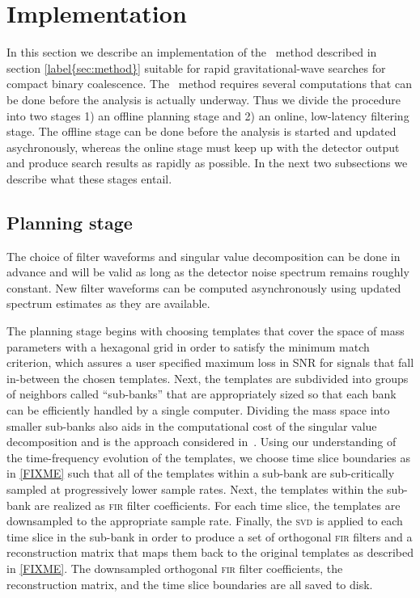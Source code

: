 \section{Implementation}
\label{sec:implementation}

In this section we describe an implementation of the \lloid\ method described
in section \ref{label{sec:method}} suitable for rapid gravitational-wave
searches for compact binary coalescence.  The \lloid\ method requires several
computations that can be done before the analysis is actually underway.  Thus
we divide the procedure into two stages 1) an offline planning stage and 2) an
online, low-latency filtering stage.  The offline stage can be done before the
analysis is started and updated asychronously, whereas the online stage must
keep up with the detector output and produce search results as rapidly as
possible.  In the next two subsections we describe what these stages entail.

\subsection{Planning stage}

The choice of filter waveforms and singular value decomposition can be done in
advance and will be valid as long as the detector noise spectrum remains
roughly constant.  New filter waveforms can be computed asynchronously using
updated spectrum estimates as they are available. 

The planning stage begins with choosing templates that cover the space of mass
parameters with a hexagonal grid \cite{PhysRevD.76.102004} in order to satisfy
the minimum match criterion, which assures a user specified maximum loss in SNR
for signals that fall in-between the chosen templates.  Next, the templates are
subdivided into groups of neighbors called ``sub-banks'' that are appropriately
sized so that each bank can be efficiently handled by a single computer.
Dividing the mass space into smaller sub-banks also aids in the computational
cost of the singular value decomposition and is the approach considered
in~\cite{Cannon:2010p10398}.  Using our understanding of the time-frequency
evolution of the templates, we choose time slice boundaries as in \eqref{FIXME}
such that all of the templates within a sub-bank are sub-critically sampled at
progressively lower sample rates.  Next, the templates within the sub-bank are
realized as \textsc{fir} filter coefficients.  For each time slice, the
templates are downsampled to the appropriate sample rate.  Finally, the
\textsc{svd} is applied to each time slice in the sub-bank in order to produce
a set of orthogonal \textsc{fir} filters and a reconstruction matrix that maps
them back to the original templates as described in \eqref{FIXME}.  The
downsampled orthogonal \textsc{fir} filter coefficients, the reconstruction
matrix, and the time slice boundaries are all saved to disk.

